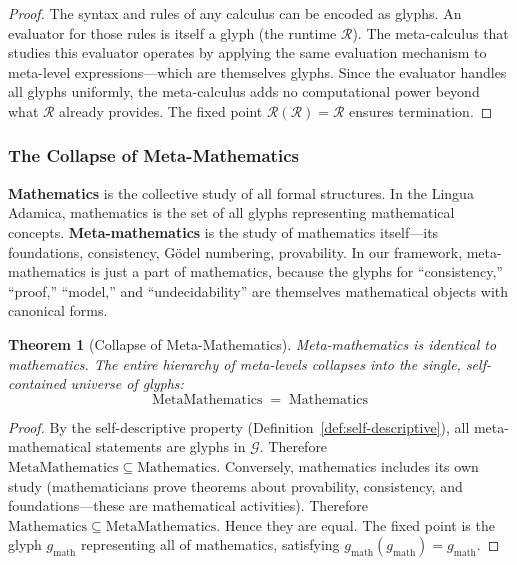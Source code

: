 \documentclass[12pt, letterpaper]{book}
\def\equiv{=}%
\def\mathfrak#1{#1}%
\newtheorem{theorem}{Theorem}[chapter]
\begin{document}
\begin{proof}
The syntax and rules of any calculus can be encoded as glyphs. An evaluator for those rules is itself a glyph (the runtime $\mathcal{R}$). The meta-calculus that studies this evaluator operates by applying the same evaluation mechanism to meta-level expressions---which are themselves glyphs. Since the evaluator handles all glyphs uniformly, the meta-calculus adds no computational power beyond what $\mathcal{R}$ already provides. The fixed point $\mathcal{R}(\mathcal{R}) \equiv \mathcal{R}$ ensures termination.
\end{proof}

\subsubsection{The Collapse of Meta-Mathematics}

\textbf{Mathematics} is the collective study of all formal structures. In the Lingua Adamica, mathematics is the set of all glyphs representing mathematical concepts. \textbf{Meta-mathematics} is the study of mathematics itself---its foundations, consistency, G\"odel numbering, provability. In our framework, meta-mathematics is just a part of mathematics, because the glyphs for ``consistency,'' ``proof,'' ``model,'' and ``undecidability'' are themselves mathematical objects with canonical forms.

\begin{theorem}[Collapse of Meta-Mathematics]\label{thm:meta-math}
Meta-mathematics is identical to mathematics. The entire hierarchy of meta-levels collapses into the single, self-contained universe of glyphs:
\[
\mathrm{MetaMathematics} \;\equiv\; \mathrm{Mathematics}
\]
\end{theorem}

\begin{proof}
By the self-descriptive property (Definition~\ref{def:self-descriptive}), all meta-mathematical statements are glyphs in $\mathcal{G}$. Therefore $\mathrm{MetaMathematics} \subseteq \mathrm{Mathematics}$. Conversely, mathematics includes its own study (mathematicians prove theorems about provability, consistency, and foundations---these are mathematical activities). Therefore $\mathrm{Mathematics} \subseteq \mathrm{MetaMathematics}$. Hence they are equal. The fixed point is the glyph $\mathfrak{g}_{\mathrm{math}}$ representing all of mathematics, satisfying $\mathfrak{g}_{\mathrm{math}}(\mathfrak{g}_{\mathrm{math}}) = \mathfrak{g}_{\mathrm{math}}$.
\end{proof}
\end{document}
